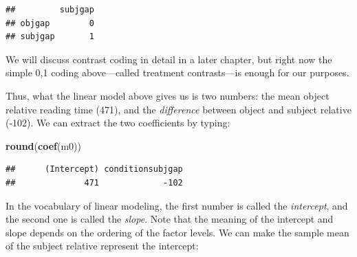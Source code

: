 \documentclass[12pt,]{krantz}
\newenvironment{Shaded}{\begin{snugshade}}{\end{snugshade}}
\newcommand{\CommentTok}[1]{\textcolor[rgb]{0.56,0.35,0.01}{\textit{#1}}}
\newcommand{\DataTypeTok}[1]{\textcolor[rgb]{0.13,0.29,0.53}{#1}}
\newcommand{\KeywordTok}[1]{\textcolor[rgb]{0.13,0.29,0.53}{\textbf{#1}}}
\newcommand{\NormalTok}[1]{#1}
\newcommand{\OperatorTok}[1]{\textcolor[rgb]{0.81,0.36,0.00}{\textbf{#1}}}
\newcommand{\StringTok}[1]{\textcolor[rgb]{0.31,0.60,0.02}{#1}}
\begin{document}
\begin{Shaded}
\end{Shaded}

\begin{verbatim}
##         subjgap
## objgap        0
## subjgap       1
\end{verbatim}

We will discuss contrast coding in detail in a later chapter, but right now the simple 0,1 coding above---called treatment contrasts---is enough for our purposes.

Thus, what the linear model above gives us is two numbers: the mean object relative reading time (471), and the \emph{difference} between object and subject relative (-102). We can extract the two coefficients by typing:

\begin{Shaded}
\begin{Highlighting}[]
\KeywordTok{round}\NormalTok{(}\KeywordTok{coef}\NormalTok{(m0))}
\end{Highlighting}
\end{Shaded}

\begin{verbatim}
##      (Intercept) conditionsubjgap 
##              471             -102
\end{verbatim}

In the vocabulary of linear modeling, the first number is called the \emph{intercept}, and the second one is called the \emph{slope}.
Note that the meaning of the intercept and slope depends on the ordering of the factor levels. We can make the sample mean of the subject relative represent the intercept:

\begin{Shaded}
\end{Shaded}
\end{document}
